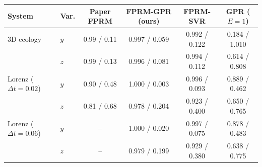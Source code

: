 \begin{tabular}{llcccc}
\toprule
System & Var. & Paper FPRM & FPRM-GPR (ours) & FPRM-SVR & GPR ($E{=}1$) \\
\midrule
3D ecology & $y$ & 0.99 / 0.11 & 0.997 / 0.059 & 0.992 / 0.122 & 0.184 / 1.010 \\
 & $z$ & 0.99 / 0.13 & 0.996 / 0.081 & 0.994 / 0.112 & 0.614 / 0.808 \\
\midrule
Lorenz ($\Delta t{=}0.02$) & $y$ & 0.90 / 0.48 & 1.000 / 0.003 & 0.996 / 0.093 & 0.889 / 0.462 \\
 & $z$ & 0.81 / 0.68 & 0.978 / 0.204 & 0.923 / 0.400 & 0.650 / 0.765 \\
\midrule
Lorenz ($\Delta t{=}0.06$) & $y$ & -- & 1.000 / 0.020 & 0.997 / 0.075 & 0.878 / 0.483 \\
 & $z$ & -- & 0.979 / 0.199 & 0.929 / 0.380 & 0.638 / 0.775 \\
\bottomrule
\end{tabular}
